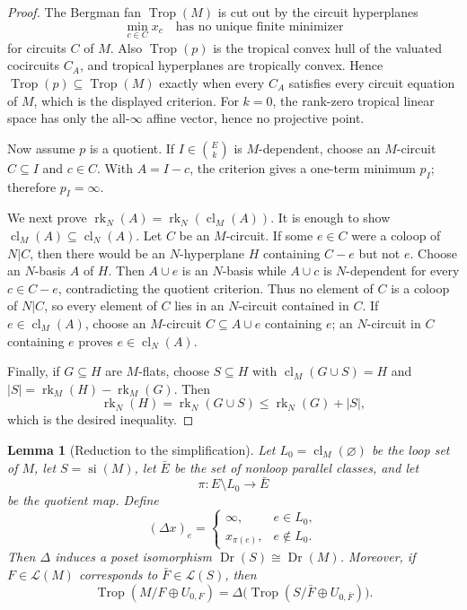 \documentclass[12pt]{article}
\newtheorem{lemma}[theorem]{Lemma}
\theoremstyle{definition}
\newcommand{\Trop}{\operatorname{Trop}}
\newcommand{\Dr}{\operatorname{Dr}}
\newcommand{\rk}{\operatorname{rk}}
\newcommand{\cl}{\operatorname{cl}}
\newcommand{\cL}{\mathcal L}
\newcommand{\binomE}[1]{\binom{E}{#1}}
\begin{document}
\begin{proof}
The Bergman fan \(\Trop(M)\) is cut out by the circuit hyperplanes
\[
\min_{c\in C}x_c\quad\text{has no unique finite minimizer}
\]
for circuits \(C\) of \(M\).  Also \(\Trop(p)\) is the tropical convex hull of the valuated cocircuits \(C_A\), and tropical hyperplanes are tropically convex.  Hence \(\Trop(p)\subseteq\Trop(M)\) exactly when every \(C_A\) satisfies every circuit equation of \(M\), which is the displayed criterion.  For \(k=0\), the rank-zero tropical linear space has only the all-\(\infty\) affine vector, hence no projective point.

Now assume \(p\) is a quotient.  If \(I\in\binomE{k}\) is \(M\)-dependent, choose an \(M\)-circuit \(C\subseteq I\) and \(c\in C\).  With \(A=I-c\), the criterion gives a one-term minimum \(p_I\); therefore \(p_I=\infty\).

We next prove \(\rk_N(A)=\rk_N(\cl_M(A))\).  It is enough to show \(\cl_M(A)\subseteq\cl_N(A)\).  Let \(C\) be an \(M\)-circuit.  If some \(e\in C\) were a coloop of \(N|C\), then there would be an \(N\)-hyperplane \(H\) containing \(C-e\) but not \(e\).  Choose an \(N\)-basis \(A\) of \(H\).  Then \(A\cup e\) is an \(N\)-basis while \(A\cup c\) is \(N\)-dependent for every \(c\in C-e\), contradicting the quotient criterion.  Thus no element of \(C\) is a coloop of \(N|C\), so every element of \(C\) lies in an \(N\)-circuit contained in \(C\).  If \(e\in\cl_M(A)\), choose an \(M\)-circuit \(C\subseteq A\cup e\) containing \(e\); an \(N\)-circuit in \(C\) containing \(e\) proves \(e\in\cl_N(A)\).

Finally, if \(G\subseteq H\) are \(M\)-flats, choose \(S\subseteq H\) with \(\cl_M(G\cup S)=H\) and \(|S|=\rk_M(H)-\rk_M(G)\).  Then
\[
\rk_N(H)=\rk_N(G\cup S)\le \rk_N(G)+|S|,
\]
which is the desired inequality.
\end{proof}

\begin{lemma}[Reduction to the simplification]\label{lem:simplification}
Let \(L_0=\cl_M(\varnothing)\) be the loop set of \(M\), let \(S=\operatorname{si}(M)\), let \(\bar E\) be the set of nonloop parallel classes, and let
\[
\pi:E\setminus L_0\to \bar E
\]
be the quotient map.  Define
\[
(\Delta x)_e=
\begin{cases}
\infty,& e\in L_0,\\
x_{\pi(e)},& e\notin L_0.
\end{cases}
\]
Then \(\Delta\) induces a poset isomorphism \(\Dr(S)\cong \Dr(M)\).  Moreover, if \(F\in\cL(M)\) corresponds to \(\bar F\in\cL(S)\), then
\[
\Trop(M/F\oplus U_{0,F})
=
\Delta\bigl(\Trop(S/\bar F\oplus U_{0,\bar F})\bigr).
\]
\end{lemma}
\end{document}
